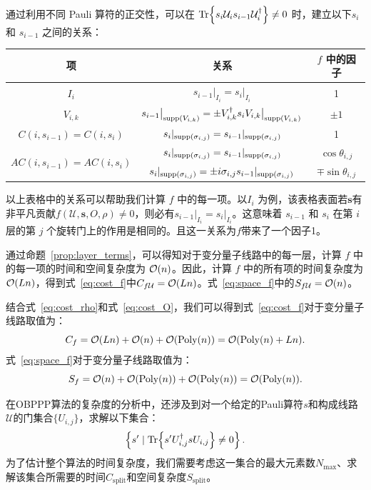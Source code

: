 \begin{remark}\label{remark:f_ele}
通过利用不同 Pauli 算符的正交性，可以在 $\Tr{s_i\mathcal{U}_i s_{i-1}\mathcal{U}_i^\dagger} \neq 0$ 时，建立以下$s_i$ 和 $s_{i-1}$ 之间的关系：

\begin{tabular}{|c|c|c|}
  \hline
   项 & 关系 & $f$ 中的因子\\
  \hline
  ${I_i}$ &$s_{i-1}\big|_{I_i} = s_{i}\big|_{I_i}$& 1 \\
  \hline
  $V_{i,k}$ &$s_{i-1}\big|_{\text{supp} \left( V_{i,k} \right)}= \pm V_{i,k}^{\dagger} s_{i}V_{i,k}\big|_{\text{supp} \left( V_{i,k} \right)}$& $\pm 1$ \\
  \hline
  $C(i,s_{i-1})=C(i,s_{i})$&$s_{i}|_{\text{supp} \left( \sigma_{i,j} \right)}=s_{i-1}|_{\text{supp} \left( \sigma_{i,j} \right)}$& 1 \\
  \hline
  \multirow{2}{*}{$AC(i,s_{i-1})=AC(i,s_{i})$}
  &$s_{i}|_{\text{supp} \left( \sigma_{i,j} \right)}=s_{i-1}|_{\text{supp} \left( \sigma_{i,j} \right)}$& $\cos{\theta_{i,j}}$ \\
  \cline{2-3}
  &$s_{i}|_{\text{supp} \left( \sigma_{i,j} \right)}=\pm i \sigma_{i,j} s_{i-1}|_{\text{supp} \left( \sigma_{i,j} \right)}$& $\mp \sin{\theta_{i,j}}$ \\
  \hline
\end{tabular}

以上表格中的关系可以帮助我们计算 $f$ 中的每一项。以$I_i$ 为例，该表格表面若$\bm{s}$有非平凡贡献$f(\mathcal{U},\bm{s},O,\rho) \neq 0$，则必有$s_{i-1}\big|_{I_i} = s_{i}\big|_{I_i}$。这意味着 $s_{i-1}$ 和 $s_{i}$ 在第 $i$ 层的第 $j$ 个旋转门上的作用是相同的。且这一关系为$f$带来了一个因子1。

通过命题~\ref{prop:layer_terms}，可以得知对于变分量子线路中的每一层，计算 $f$ 中的每一项的时间和空间复杂度为 $\order{n}$。因此，计算 $f$ 中的所有项的时间复杂度为 $\order{L n}$，得到式~\eqref{eq:cost_f}中$C_{f\mathcal{U}}=\order{L n}$。式~\eqref{eq:space_f}中的$S_{f\mathcal{U}}=\order{n}$。
\end{remark}

结合式~\eqref{eq:cost_rho}和式~\eqref{eq:cost_O}，我们可以得到式~\eqref{eq:cost_f}对于变分量子线路取值为：
\begin{equation}\label{eq:vqa:c_f}
    C_f=\order{L n}+\order{n}+\order{\poly(n)}=\order{\poly(n)+L n}.
\end{equation}
式~\eqref{eq:space_f}对于变分量子线路取值为：
\begin{equation}
    S_f=\order{n}+\order{\poly(n)}+\order{\poly(n)}=\order{\poly(n)}.
\end{equation}


在OBPPP算法的复杂度的分析中，还涉及到对一个给定的Pauli算符$s$和构成线路$\mathcal{U}$的门集合$\{U_{i,j}\}$，求解以下集合：
\begin{equation}
    \left\{ s'\mid \Tr{s' U^\dagger_{i,j}s U_{i,j}}\neq 0 \right\}.
\end{equation}
为了估计整个算法的时间复杂度，我们需要考虑这一集合的最大元素数$N_{\text{max}}$、求解该集合所需要的时间$C_{\text{split}}$和空间复杂度$S_{\text{split}}$。

